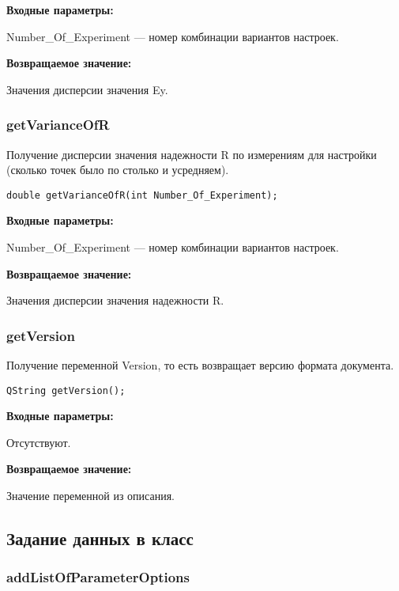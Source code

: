 \documentclass[a4paper,12pt]{article}
\begin{document}
\textbf{Входные параметры:}

Number\_Of\_Experiment --- номер комбинации вариантов настроек.

\textbf{Возвращаемое значение:}

Значения дисперсии значения Ey.


\subsubsection{getVarianceOfR}\label{getVarianceOfR}

Получение дисперсии значения надежности R по измерениям для настройки (сколько точек было по столько и усредняем).


\begin{lstlisting}[label=code_syntax_getVarianceOfR,caption=Синтаксис]
double getVarianceOfR(int Number_Of_Experiment);
\end{lstlisting}

\textbf{Входные параметры:}

Number\_Of\_Experiment --- номер комбинации вариантов настроек.

\textbf{Возвращаемое значение:}

Значения дисперсии значения надежности R.


\subsubsection{getVersion}\label{getVersion}

Получение переменной Version, то есть возвращает версию формата документа.


\begin{lstlisting}[label=code_syntax_getVersion,caption=Синтаксис]
QString getVersion();
\end{lstlisting}

\textbf{Входные параметры:}

Отсутствуют.

\textbf{Возвращаемое значение:}

Значение переменной из описания.


\subsection{Задание данных в класс}

\subsubsection{addListOfParameterOptions}\label{addListOfParameterOptions}
\end{document}
